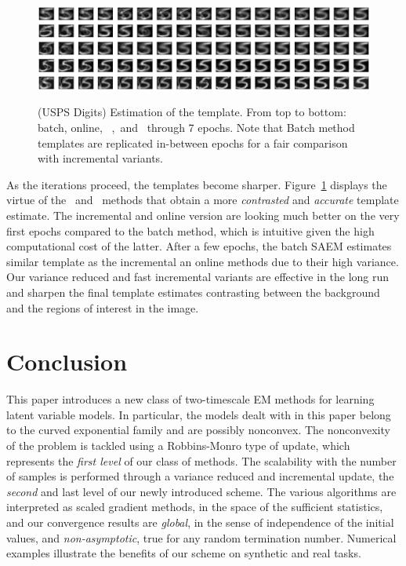 \documentclass[11pt]{article}
\theoremstyle{t}
\begin{document}
\begin{figure}[H]
\begin{center}
\includegraphics[width=\textwidth]{pic_paper/deformable3}\vspace{-.2cm}
\caption{(USPS Digits) Estimation of the template. From top to bottom: batch, online, \ISAEM\ ,\SAEMVR\ and \FISAEM\ through 7 epochs. Note that Batch method templates are replicated in-between epochs for a fair comparison with incremental variants. }\vspace{-.2cm}
\label{fig:results}
\end{center}
\end{figure}\vspace{-0.1in}
As the iterations proceed, the templates become sharper.
Figure~\ref{fig:results} displays the virtue of the \SAEMVR\ and \FISAEM\ methods that obtain a more \textit{contrasted} and \textit{accurate} template estimate. The incremental and online version are looking much better on the very first epochs compared to the batch method, which is intuitive given the high computational cost of the latter. After a few epochs, the batch SAEM estimates similar template as the incremental an online methods due to their high variance. Our variance reduced and fast incremental variants are effective in the long run and sharpen the final template estimates contrasting between the background and the regions of interest in the image.

\vspace{-0.05in}
\section{Conclusion}
\vspace{-0.05in}

This paper introduces a new class of two-timescale EM methods for learning latent variable models.
In particular, the models dealt with in this paper belong to the curved exponential family and are possibly nonconvex.
The nonconvexity of the problem is tackled using a Robbins-Monro type of update, which represents the \textit{first level} of our class of methods.
The scalability with the number of samples is performed through a variance reduced and incremental update, the \textit{second} and last level of our newly introduced scheme.
The various algorithms are interpreted as scaled gradient methods, in the space of the sufficient statistics, and our convergence results are \emph{global}, in the sense of independence of the initial values, and \emph{non-asymptotic}, \ie true for any random termination number.
Numerical examples illustrate the benefits of our scheme on synthetic and real tasks.
\end{document}
